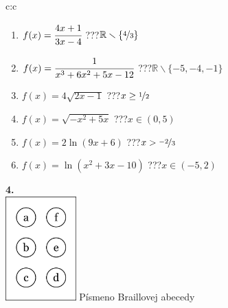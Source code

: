 \documentclass[10pt]{report}
\begin{document}
\begin{tabular}{c:c}
\begin{minipage}[c][104.5mm][t]{0.5\linewidth}
\begin{center}
\begin{minipage}{0.79\linewidth}
\begin{center}
\begin{varwidth}{\linewidth}
\begin{enumerate}
\normalsizerrr
\item $f(x)=\cfrac{4x+1}{3x-4}$\quad \dotfill\; ???\;\dotfill \quad $\mathbb{R}\smallsetminus\{\nicefrac{4}{3}\}$
\item $f(x)=\cfrac{1}{x^3+6x^2+5x-12}$\quad \dotfill\; ???\;\dotfill \quad $\mathbb{R}\smallsetminus\{-5,-4,-1\}$
\item $f(x)=4\sqrt{2x-1}$\quad \dotfill\; ???\;\dotfill \quad $x\geq\nicefrac{1}{2}$
\item $f(x)=\sqrt{-x^2+5x}$\quad \dotfill\; ???\;\dotfill \quad $x\in(0 , 5)$
\item $f(x)=2\ln{(9x+6)}$\quad \dotfill\; ???\;\dotfill \quad $x>\nicefrac{-2}{3}$
\item $f(x)=\ln{(x^2+3x-10)}$\quad \dotfill\; ???\;\dotfill \quad $x\in(-5 , 2)$
\end{enumerate}
\end{varwidth}
\end{center}
\end{minipage}
\begin{minipage}{0.20\linewidth}
\begin{center}
{\Huge\bfseries 4.} \\[2mm]
\includegraphics[height=40mm]{../images/braille.png}
{\small Písmeno Braillovej abecedy}
\end{center}
\end{minipage}
\end{center}
\end{minipage}
%
\end{tabular}
\newpage
\thispagestyle{empty}
\end{document}
